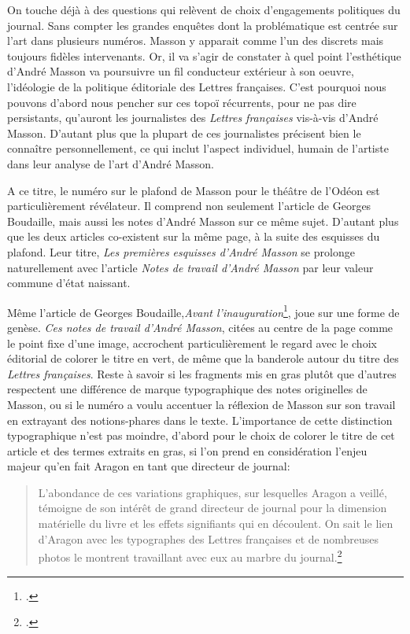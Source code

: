 On touche déjà à des questions qui relèvent de choix d’engagements politiques du journal. Sans compter les grandes enquêtes dont la problématique est centrée sur l’art dans plusieurs numéros. Masson y apparait comme l’un des discrets mais toujours fidèles intervenants. Or, il va s’agir de constater à quel point l’esthétique d’André Masson va poursuivre un fil conducteur extérieur à son oeuvre, l’idéologie de la politique éditoriale des Lettres françaises. C’est pourquoi nous pouvons d’abord nous pencher sur ces topoï récurrents, pour ne pas dire persistants, qu’auront les journalistes des \emph{Lettres françaises} vis-à-vis d’André Masson. D’autant plus que la plupart de ces journalistes précisent bien le connaître personnellement, ce qui inclut l’aspect individuel, humain de l’artiste dans leur analyse de l’art d’André Masson. 

	A ce titre, le numéro sur le plafond de Masson pour le théâtre de l’Odéon est particulièrement révélateur. Il comprend non seulement l’article de Georges Boudaille, mais aussi les notes d’André Masson sur ce même sujet. D’autant plus que les deux articles co-existent sur la même page, à la suite des esquisses du plafond. Leur titre, \emph{Les premières esquisses d’André Masson} se prolonge naturellement avec l’article \emph{Notes de travail d’André Masson} par leur valeur commune d’état naissant. 


Même l’article de Georges Boudaille,\emph{Avant l’inauguration}\footcite{avantinauguration}, joue sur une forme de genèse. \emph{Ces notes de travail d’André Masson}, citées au centre de la page comme le point fixe d’une image, accrochent particulièrement le regard avec le choix éditorial de colorer le titre en vert, de même que la banderole autour du titre des \emph{Lettres françaises}. Reste à savoir si les fragments mis en gras plutôt que d’autres respectent une différence de marque typographique des notes originelles de Masson, ou si le numéro a voulu accentuer la réflexion de Masson sur son travail en extrayant des notions-phares dans le texte. L’importance de cette distinction typographique n’est pas moindre, d’abord pour le choix de colorer le titre de cet article et des termes extraits en gras, si l’on prend en considération l’enjeu majeur qu’en fait Aragon en tant que directeur de journal: 

\begin{quote}
L’abondance de ces variations graphiques, sur lesquelles Aragon a veillé, témoigne de son intérêt de grand directeur de journal pour la dimension matérielle du livre et les effets signifiants qui en découlent. On sait le lien d’Aragon avec les typographes des Lettres françaises et de nombreuses photos le montrent travaillant avec eux au marbre du journal.\footcite[p333]{vasseviere}	
\end{quote}

